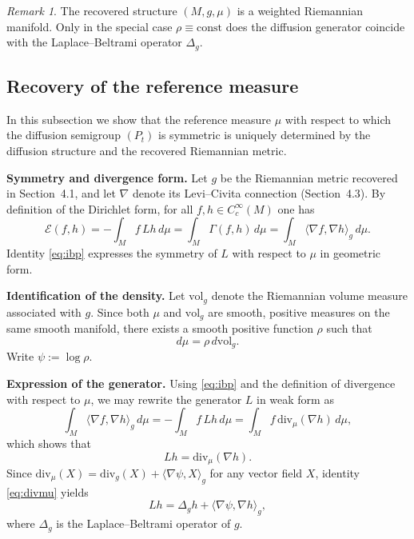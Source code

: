 \documentclass[11pt]{amsart}
\theoremstyle{definition}
\theoremstyle{remark}
\newtheorem{remark}[theorem]{Remark}
\begin{document}
\begin{remark}
The recovered structure $(M,g,\mu)$ is a weighted Riemannian manifold.
Only in the special case $\rho\equiv\mathrm{const}$ does the diffusion generator
coincide with the Laplace--Beltrami operator $\Delta_g$.
\end{remark}


\subsection{Recovery of the reference measure}\label{subsec:recover-measure}

In this subsection we show that the reference measure $\mu$ with respect to which the
diffusion semigroup $(P_t)$ is symmetric is uniquely determined by the diffusion structure
and the recovered Riemannian metric.

\medskip
\noindent\textbf{Symmetry and divergence form.}
Let $g$ be the Riemannian metric recovered in Section~4.1, and let $\nabla$ denote its
Levi--Civita connection (Section~4.3).
By definition of the Dirichlet form,
for all $f,h\in C_c^\infty(M)$ one has
\begin{equation}\label{eq:ibp}
\mathcal E(f,h)
=
-\int_M f\,Lh\,d\mu
=
\int_M \Gamma(f,h)\,d\mu
=
\int_M \langle\nabla f,\nabla h\rangle_g\,d\mu.
\end{equation}
Identity \eqref{eq:ibp} expresses the symmetry of $L$ with respect to $\mu$ in geometric form.

\medskip
\noindent\textbf{Identification of the density.}
Let $\mathrm{vol}_g$ denote the Riemannian volume measure associated with $g$.
Since both $\mu$ and $\mathrm{vol}_g$ are smooth, positive measures on the same smooth
manifold, there exists a smooth positive function $\rho$ such that
\[
d\mu = \rho\,d\mathrm{vol}_g.
\]
Write $\psi:=\log\rho$.

\medskip
\noindent\textbf{Expression of the generator.}
Using \eqref{eq:ibp} and the definition of divergence with respect to $\mu$, we may
rewrite the generator $L$ in weak form as
\[
\int_M \langle\nabla f,\nabla h\rangle_g\,d\mu
=
-\int_M f\,Lh\,d\mu
=
\int_M f\,\mathrm{div}_\mu(\nabla h)\,d\mu,
\]
which shows that
\begin{equation}\label{eq:divmu}
Lh = \mathrm{div}_\mu(\nabla h).
\end{equation}
Since $\mathrm{div}_\mu(X)=\mathrm{div}_g(X)+\langle\nabla\psi,X\rangle_g$ for any vector
field $X$, identity \eqref{eq:divmu} yields
\begin{equation}\label{eq:L-drift}
Lh = \Delta_g h + \langle\nabla\psi,\nabla h\rangle_g,
\end{equation}
where $\Delta_g$ is the Laplace--Beltrami operator of $g$.
\end{document}
